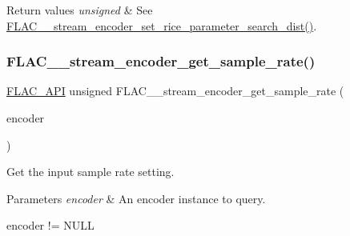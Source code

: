 \begin{DoxyRetVals}{Return values}
{\em unsigned} & See \hyperlink{group__flac__stream__encoder_ga668de93e7061bce21475c062ffab3e18}{F\+L\+A\+C\+\_\+\+\_\+stream\+\_\+encoder\+\_\+set\+\_\+rice\+\_\+parameter\+\_\+search\+\_\+dist()}. \\
\hline
\end{DoxyRetVals}
\mbox{\label{group__flac__stream__encoder_gacc8f4820dea783cc0fc2906b6078b333}} 
\subsubsection{\texorpdfstring{F\+L\+A\+C\+\_\+\+\_\+stream\+\_\+encoder\+\_\+get\+\_\+sample\+\_\+rate()}{FLAC\_\_stream\_encoder\_get\_sample\_rate()}}
{\footnotesize\ttfamily \hyperlink{group__flac__export_ga56ca07df8a23310707732b1c0007d6f5}{F\+L\+A\+C\+\_\+\+A\+PI} unsigned F\+L\+A\+C\+\_\+\+\_\+stream\+\_\+encoder\+\_\+get\+\_\+sample\+\_\+rate (\begin{DoxyParamCaption}\item[{\hyperlink{zconf_8h_a2c212835823e3c54a8ab6d95c652660e}{const} \hyperlink{struct_f_l_a_c_____stream_encoder}{F\+L\+A\+C\+\_\+\+\_\+\+Stream\+Encoder} $\ast$}]{encoder }\end{DoxyParamCaption})}

Get the input sample rate setting.


\begin{DoxyParams}{Parameters}
{\em encoder} & An encoder instance to query.  
\begin{DoxyCode}
encoder != NULL 
\end{DoxyCode}
 \\
\hline
\end{DoxyParams}

